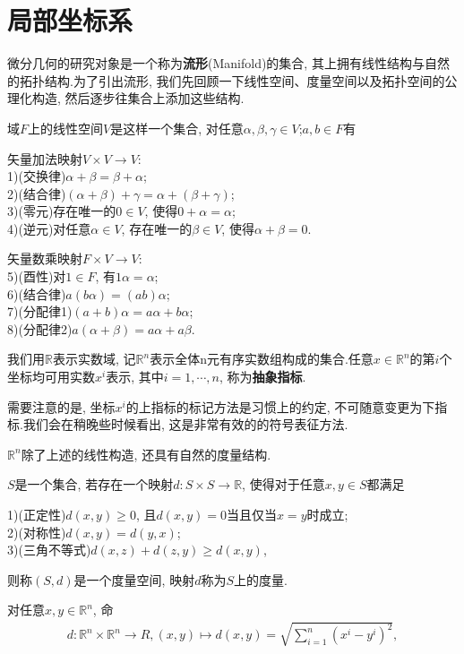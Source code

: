 \section{局部坐标系}\label{sec:Coordinates}
微分几何的研究对象是一个称为\textbf{流形}(Manifold)的集合, 其上拥有线性结构与自然的拓扑结构.为了引出流形, 我们先回顾一下线性空间、度量空间以及拓扑空间的公理化构造, 然后逐步往集合上添加这些结构.
\begin{definition}
  域$F$上的线性空间$V$是这样一个集合, 对任意$\alpha,\beta,\gamma\in V$;$a,b\in F$有

  矢量加法映射$V\times V\rightarrow V$: \\
  1)(交换律)$\alpha+\beta=\beta+\alpha$;\\
  2)(结合律)$(\alpha+\beta)+\gamma=\alpha+(\beta+\gamma)$;\\
  3)(零元)存在唯一的$0\in V$, 使得$0+\alpha=\alpha$;\\
  4)(逆元)对任意$\alpha\in V$, 存在唯一的$\beta\in V$, 使得$\alpha+\beta=0$.

  矢量数乘映射$F\times V\rightarrow V$: \\
  5)(酉性)对$1\in F$, 有$1\alpha=\alpha$;\\
  6)(结合律)$a(b\alpha)=(ab)\alpha$;\\
  7)(分配律1)$(a+b)\alpha=a\alpha+b\alpha$;\\
  8)(分配律2)$a(\alpha+\beta)=a\alpha+a\beta$.
\end{definition}
我们用$\mathbb{R}$表示实数域, 记$\mathbb{R}^n$表示全体n元有序实数组构成的集合.任意$x\in\mathbb{R}^n$的第$i$个坐标均可用实数$x^i$表示, 其中$i=1,\cdots,n$, 称为\textbf{抽象指标}.
\begin{remark}
  需要注意的是, 坐标$x^i$的上指标的标记方法是习惯上的约定, 不可随意变更为下指标.我们会在稍晚些时候看出, 这是非常有效的的符号表征方法.
\end{remark}
$\mathbb{R}^n$除了上述的线性构造, 还具有自然的度量结构.
\begin{definition}
  $S$是一个集合, 若存在一个映射$d:S\times S\rightarrow \mathbb{R}$, 使得对于任意$x,y\in S$都满足

  1)(正定性)$d(x,y)\geqslant 0$, 且$d(x,y)=0$当且仅当$x=y$时成立;\\
  2)(对称性)$d(x,y)=d(y,x)$;\\
  3)(三角不等式)$d(x,z)+d(z,y)\geqslant d(x,y)$,

  则称$(S,d)$是一个度量空间, 映射$d$称为$S$上的度量.
\end{definition}
对任意$x,y\in \mathbb{R}^n$, 命
\begin{equation}\label{eq:metric of R}
  \begin{split}
    d:\mathbb{R}^n\times \mathbb{R}^n\rightarrow R,(x,y)\mapsto d(x,y)=\sqrt{\sum_{i=1}^n(x^i-y^i)^2},
  \end{split}
\end{equation}
